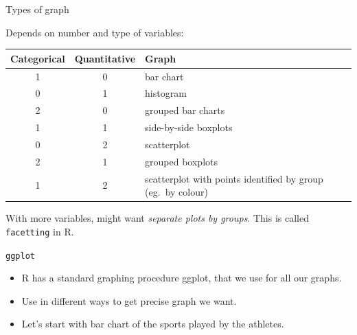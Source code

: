 \documentclass[
  ignorenonframetext,
]{beamer}
\providecommand{\tightlist}{%
  \setlength{\itemsep}{0pt}\setlength{\parskip}{0pt}}
\begin{document}
\begin{frame}[fragile]{Types of graph}
\protect\hypertarget{types-of-graph}{}

Depends on number and type of variables:

\begin{tabular}{ccp{}}
    Categorical & Quantitative & Graph\\
    \hline
    1 & 0 & bar chart\\
    0 & 1 & histogram\\
    2 & 0 & grouped bar charts\\
    1 & 1 & side-by-side boxplots\\
    0 & 2 & scatterplot\\
    2 & 1 & grouped boxplots\\
    1 & 2 & scatterplot with points identified by group (eg.\ by colour)\\
    \hline
  \end{tabular}

With more variables, might want \emph{separate plots by groups}. This is
called \texttt{facetting} in R.

\end{frame}

\begin{frame}{\texttt{ggplot}}
\protect\hypertarget{ggplot}{}

\begin{itemize}
\tightlist
\item
  R has a standard graphing procedure ggplot, that we use for all our
  graphs.
\item
  Use in different ways to get precise graph we want.
\item
  Let's start with bar chart of the sports played by the athletes.
\end{itemize}

\end{frame}
\end{document}
